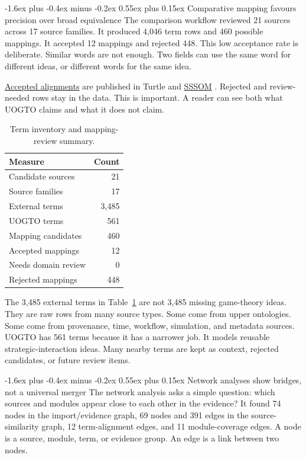 \documentclass[11pt]{article}
\makeatletter
\renewcommand\subsection{\@startsection{subsection}{2}{\z@}%
  {-1.6ex plus -0.4ex minus -0.2ex}%
  {0.55ex plus 0.15ex}%
  {\normalfont\large\bfseries\color{uogtoInk}}}
\newcommand{\glslink}[2]{\hyperlink{gloss:#1}{#2}}
\newcommand{\abblink}[2]{\hyperlink{abbr:#1}{#2}}
\makeatother
\begin{document}
\subsection{Comparative mapping favours precision over broad equivalence}
The comparison workflow reviewed 21 sources across 17 source families. It produced 4,046 term rows and 460 possible mappings. It accepted 12 mappings and rejected 448. This low acceptance rate is deliberate. Similar words are not enough. Two fields can use the same word for different ideas, or different words for the same idea.

\glslink{accepted-mapping}{Accepted alignments} are published in Turtle and \abblink{sssom}{SSSOM} \cite{sssom-2022}. Rejected and review-needed rows stay in the data. This is important. A reader can see both what UOGTO claims and what it does not claim.

\begin{table}[ht]
\centering
\caption{Term inventory and mapping-review summary.}
\label{tab:mapping-summary}
\begin{tabular}{lr}
\toprule
Measure & Count \\
\midrule
Candidate sources & 21 \\
Source families & 17 \\
External terms & 3,485 \\
UOGTO terms & 561 \\
Mapping candidates & 460 \\
Accepted mappings & 12 \\
Needs domain review & 0 \\
Rejected mappings & 448 \\
\bottomrule
\end{tabular}
\end{table}

The 3,485 external terms in Table~\ref{tab:mapping-summary} are not 3,485 missing game-theory ideas. They are raw rows from many source types. Some come from upper ontologies. Some come from provenance, time, workflow, simulation, and metadata sources. UOGTO has 561 terms because it has a narrower job. It models reusable strategic-interaction ideas. Many nearby terms are kept as context, rejected candidates, or future review items.

\subsection{Network analyses show bridges, not a universal merger}
The network analysis asks a simple question: which sources and modules appear close to each other in the evidence? It found 74 nodes in the import/evidence graph, 69 nodes and 391 edges in the source-similarity graph, 12 term-alignment edges, and 11 module-coverage edges. A node is a source, module, term, or evidence group. An edge is a link between two nodes.
\end{document}

